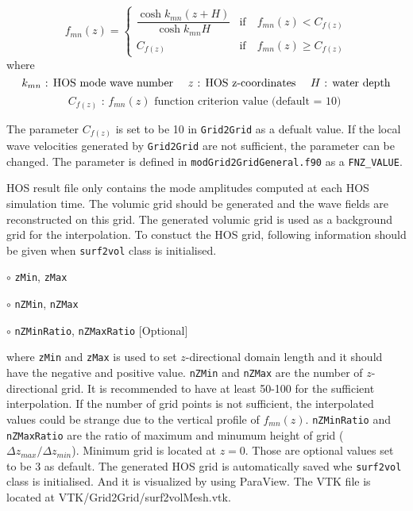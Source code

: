 \vspace{1em}
{
	\begin{equation}
	\label{eq:fnzCriterion}
	f_{mn}(z) = \begin{cases}
	\dfrac{\cosh k_{mn}(z+H)}{\cosh k_{mn}H}  &  \text{if} \quad f_{mn}(z) < C_{f(z)} \\
	C_{f(z)}  &  \text{if} \quad f_{mn}(z) \geq C_{f(z)}
	\end{cases}
	\end{equation}
	\newline
	\centering
	where
	\begin{equation*}
	k_{mn}	\text{ : HOS mode wave number \quad  $z$ : HOS z-coordinates \quad $H$ :  water depth}
	\end{equation*} 
	\begin{equation*}
	C_{f(z)}  \text{ : $f_{mn}(z)$ function criterion value (default = 10) }
	\end{equation*}
}

The parameter $C_{f(z)}$ is set to be 10 in \texttt{Grid2Grid} as a defualt value. If the local wave velocities generated by \texttt{Grid2Grid} are not sufficient, the parameter can be changed. The parameter is defined in \texttt{modGrid2GridGeneral.f90} as a \texttt{FNZ\_VALUE}.

HOS result file only contains the mode amplitudes computed at each HOS simulation time. The volumic grid should be generated and the wave fields are reconstructed on this grid. The generated volumic grid is used as a background grid for the interpolation. To constuct the HOS grid, following information should be given when \texttt{surf2vol} class is initialised.

\vspace*{0.5em}
\hspace{0.5 cm} $\circ$ \texttt{zMin}, \texttt{zMax}

\hspace{0.5 cm} $\circ$ \texttt{nZMin}, \texttt{nZMax}

\hspace{0.5 cm} $\circ$ \texttt{nZMinRatio}, \texttt{nZMaxRatio} [Optional]

\pagebreak

where \texttt{zMin} and \texttt{zMax} is used to set $z$-directional domain length and it should have the negative and positive value. \texttt{nZMin} and \texttt{nZMax} are the number of $z$-directional grid. It is recommended to have at least 50-100 for the sufficient interpolation. If the number of grid points is not sufficient, the interpolated values could be strange due to the vertical profile of $f_{mn}(z)$. \texttt{nZMinRatio} and \texttt{nZMaxRatio} are the ratio of maximum and minumum height of grid (${\Delta z_{max}}/{\Delta z_{min}} $). Minimum grid is located at $z=0$. Those are optional values set to be 3 as default. The generated HOS grid is automatically saved whe \texttt{surf2vol} class is initialised. And it is visualized by using ParaView. The VTK file is located at VTK/Grid2Grid/surf2volMesh.vtk.

